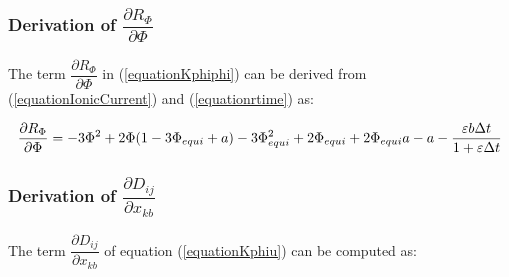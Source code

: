 \documentclass[oneside,11pt,times]{book}
\begin{document}
\subsubsection{Derivation of $\dfrac{\partial{R_{\Phi}}}{\partial{\Phi}}$}
The term $\dfrac{\partial{R_{\Phi}}}{\partial{\Phi}}$ in (\ref{equationKphiphi}) can be derived from (\ref{equationIonicCurrent}) and (\ref{equationrtime}) as:

\begin{equation}
\begin{aligned}
\centering
\dfrac{\partial{R_{\Phi}}}{\partial{\Phi}}=-3\Phi^{2}+2\Phi(1-3\Phi_{equi}+a)-3\Phi_{equi}^{2}+2\Phi_{equi}+2\Phi_{equi}a-a-\dfrac{\varepsilon b\Delta t}{1+\varepsilon\Delta t}
\end{aligned}
\label{equationdRdPhi}
\end{equation}

\subsubsection{Derivation of $\dfrac{\partial{D_{ij}}}{\partial{x_{kb}}}$}

The term $\dfrac{\partial{{D_{ij}}}}{\partial{x_{kb}}}$ of equation (\ref{equationKphiu}) can be computed as:
\end{document}
